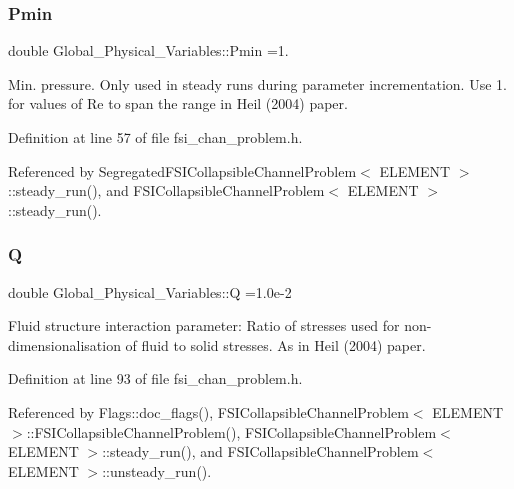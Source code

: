 \subsubsection{\texorpdfstring{Pmin}{Pmin}}
{\footnotesize\ttfamily double Global\+\_\+\+Physical\+\_\+\+Variables\+::\+Pmin =1.}



Min. pressure. Only used in steady runs during parameter incrementation. Use 1. for values of Re to span the range in Heil (2004) paper. 



Definition at line 57 of file fsi\+\_\+chan\+\_\+problem.\+h.



Referenced by Segregated\+F\+S\+I\+Collapsible\+Channel\+Problem$<$ E\+L\+E\+M\+E\+N\+T $>$\+::steady\+\_\+run(), and F\+S\+I\+Collapsible\+Channel\+Problem$<$ E\+L\+E\+M\+E\+N\+T $>$\+::steady\+\_\+run().

\mbox{\label{namespaceGlobal__Physical__Variables_a66cb7ecda9ba0cd72367dd697f154545}} 
\subsubsection{\texorpdfstring{Q}{Q}}
{\footnotesize\ttfamily double Global\+\_\+\+Physical\+\_\+\+Variables\+::Q =1.\+0e-\/2}



Fluid structure interaction parameter\+: Ratio of stresses used for non-\/dimensionalisation of fluid to solid stresses. As in Heil (2004) paper. 



Definition at line 93 of file fsi\+\_\+chan\+\_\+problem.\+h.



Referenced by Flags\+::doc\+\_\+flags(), F\+S\+I\+Collapsible\+Channel\+Problem$<$ E\+L\+E\+M\+E\+N\+T $>$\+::\+F\+S\+I\+Collapsible\+Channel\+Problem(), F\+S\+I\+Collapsible\+Channel\+Problem$<$ E\+L\+E\+M\+E\+N\+T $>$\+::steady\+\_\+run(), and F\+S\+I\+Collapsible\+Channel\+Problem$<$ E\+L\+E\+M\+E\+N\+T $>$\+::unsteady\+\_\+run().

\mbox{\label{namespaceGlobal__Physical__Variables_ab814e627d2eb5bc50318879d19ab16b9}} 
